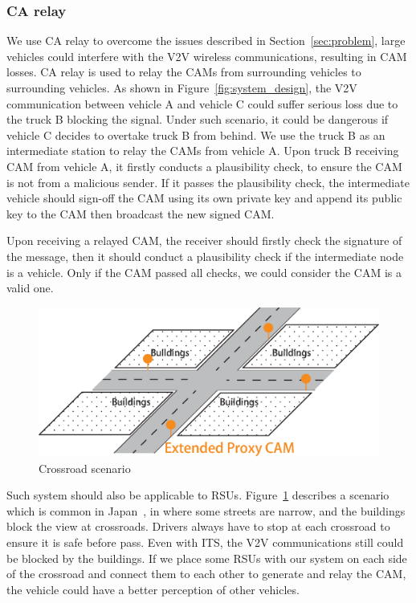 \subsubsection{CA relay}

We use CA relay to overcome the issues described in Section~\ref{sec:problem},
large vehicles could interfere with the V2V wireless communications, resulting in CAM losses.
CA relay is used to relay the CAMs from surrounding vehicles to surrounding vehicles.
As shown in Figure~\ref{fig:system_design},
the V2V communication between vehicle A and vehicle C could suffer serious loss due to the truck B blocking the signal.
Under such scenario, it could be dangerous if vehicle C decides to overtake truck B from behind.
We use the truck B as an intermediate station to relay the CAMs from vehicle A.
Upon truck B receiving CAM from vehicle A, it firstly conducts a plausibility check,
to ensure the CAM is not from a malicious sender.
If it passes the plausibility check,
the intermediate vehicle should sign-off the CAM using its own private key and append its public key to the CAM then broadcast the new signed CAM.

Upon receiving a relayed CAM, the receiver should firstly check the signature of the message,
then it should conduct a plausibility check if the intermediate node is a vehicle.
Only if the CAM passed all checks, we could consider the CAM is a valid one.

\begin{figure}[htbp]
    \begin{center}
        \includegraphics[width=0.85\linewidth]{figures/crossroad.eps}
        \caption{Crossroad scenario}
        \label{fig:crossroad}
    \end{center}
\end{figure}

Such system should also be applicable to RSUs.
Figure~\ref{fig:crossroad} describes a scenario which is common in Japan~\cite{tsugawa2011current},
in where some streets are narrow, and the buildings block the view at crossroads.
Drivers always have to stop at each crossroad to ensure it is safe before pass.
Even with ITS, the V2V communications still could be blocked by the buildings.
If we place some RSUs with our system on each side of the crossroad and connect them to each other to generate and relay the CAM,
the vehicle could have a better perception of other vehicles.

